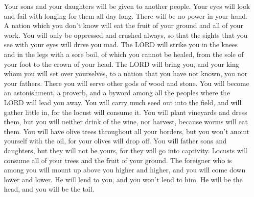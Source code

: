 \myverse{}Your sons and your daughters will be given to another people. Your eyes will
look and fail with longing for them all day long. There will be no power in your hand.
\myverse{}A nation which you don’t know will eat the fruit of your ground and all of
your work. You will only be oppressed and crushed always,
\myverse{}so that the sights that you see with your eyes will drive you mad.
\myverse{}The LORD will strike you in the knees and in the legs with a sore boil, of
which you cannot be healed, from the sole of your foot to the crown of your head.
\myverse{}The LORD will bring you, and your king whom you will set over yourselves,
to a nation that you have not known, you nor your fathers. There you will serve other gods of wood and
stone.
\myverse{}You will become an astonishment, a proverb, and a byword among all the peoples
where the LORD will lead you away.
\myverse{}You will carry much seed out into the field, and will gather little in, for
the locust will consume it.
\myverse{}You will plant vineyards and dress them, but you will neither drink of the
wine, nor harvest, because worms will eat them.
\myverse{}You will have olive trees throughout all your borders, but you won’t anoint
yourself with the oil, for your olives will drop off.
\myverse{}You will father sons and daughters, but they will not be yours, for they
will go into captivity.
\myverse{}Locusts will consume all of your trees and the fruit of your ground.
\myverse{}The foreigner who is among you will mount up above you higher and higher,
and you will come down lower and lower.
\myverse{}He will lend to you, and you won’t lend to him. He will be the head, and
you will be the tail.

